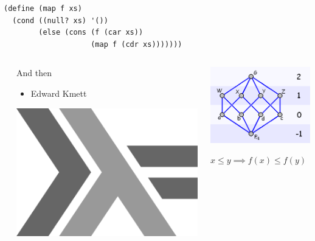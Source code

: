 \documentclass[usenames,dvipsnames,svgnames,table,aspectratio=1610,mathserif]{beamer}
\newcommand{\nl}{\vspace{\baselineskip}}
\begin{document}
\begin{frame}[fragile]

\begin{verbatim}
(define (map f xs)
  (cond ((null? xs) '())
        (else (cons (f (car xs))
                    (map f (cdr xs)))))))
\end{verbatim}
\end{frame}


\begin{frame}
\begin{columns}
\begin{column}{0.005\textwidth}
\end{column}
\begin{column}{0.4\textwidth}
And then
\begin{itemize}
\item Edward Kmett
\end{itemize}
\nl
\nl
\includegraphics[scale=0.2]{haskell.png}
\end{column}
\begin{column}{0.5\textwidth}
\includegraphics[scale=0.4]{hasse.png}

\nl
\nl

{\LARGE
  $x \le y \implies f(x) \le f(y)$
}
\end{column}
\end{columns}
\end{frame}
\end{document}

